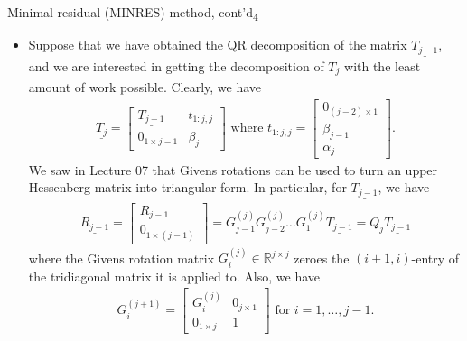 \documentclass[t,usepdftitle=false]{beamer}
\begin{document}
\begin{frame}{Minimal residual (MINRES) method, cont'd\textsubscript{4}}
\begin{itemize}
\item[] Suppose that we have obtained the QR decomposition of the matrix $\underline{T_{j-1}}$, and we are interested in getting the decomposition of $\underline{T_j}$ with the least amount of work possible.
Clearly, we have
\begin{align*}
\underline{T_j}=
\begin{bmatrix}
\underline{T_{j-1}}&t_{1:j,j}\\
0_{1\times j-1}&\beta_{j}
\end{bmatrix}
\text{ where }
t_{1:j,j}=\begin{bmatrix}0_{(j-2)\times 1}\\\beta_{j-1}\\\alpha_j\end{bmatrix}.
\end{align*}
We saw in Lecture 07 that Givens rotations can be used to turn an upper Hessenberg matrix into triangular form.
In particular, for $\underline{T_{j-1}}$, we have
\begin{align*}
\underline{R_{j-1}}=
\begin{bmatrix}
R_{j-1}\\
0_{1\times (j-1)}
\end{bmatrix}=
G_{j-1}^{(j)}G^{(j)}_{j-2}\dots G^{(j)}_1\underline{T_{j-1}}=Q_j\underline{T_{j-1}}
\end{align*}
where the Givens rotation matrix $G^{(j)}_i\in\mathbb{R}^{j\times j}$ zeroes the $(i+1,i)$-entry of the tridiagonal matrix it is applied to.
Also, we have 
\begin{align*}
G^{(j+1)}_i=
\begin{bmatrix}
G^{(j)}_i&0_{j\times 1}\\
0_{1\times j}&1
\end{bmatrix}
\text{ for }
i=1,\dots,j-1.
\end{align*}
\end{itemize}
\end{frame}
\end{document}
